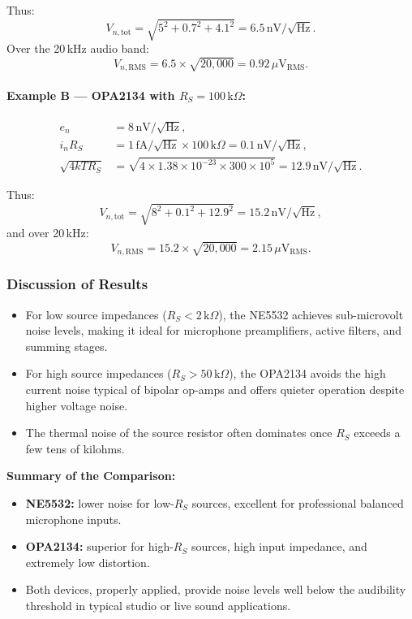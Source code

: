 Thus:
\[
V_{n,\text{tot}} = \sqrt{5^2 + 0.7^2 + 4.1^2} = 6.5\,\mathrm{nV}/\sqrt{\mathrm{Hz}}.
\]
Over the 20\,kHz audio band:
\[
V_{n,\text{RMS}} = 6.5 \times \sqrt{20{,}000} = 0.92\,\mu\text{V}_{\mathrm{RMS}}.
\]

\paragraph{Example B — OPA2134 with $R_S = 100\,\text{k}\Omega$:}
\[
\begin{aligned}
e_n &= 8\,\mathrm{nV}/\sqrt{\mathrm{Hz}}, \\
i_n R_S &= 1\,\mathrm{fA}/\sqrt{\mathrm{Hz}} \times 100\,\text{k}\Omega = 0.1\,\mathrm{nV}/\sqrt{\mathrm{Hz}}, \\
\sqrt{4kTR_S} &= \sqrt{4 \times 1.38\times10^{-23} \times 300 \times 10^5} = 12.9\,\mathrm{nV}/\sqrt{\mathrm{Hz}}.
\end{aligned}
\]

Thus:
\[
V_{n,\text{tot}} = \sqrt{8^2 + 0.1^2 + 12.9^2} = 15.2\,\mathrm{nV}/\sqrt{\mathrm{Hz}},
\]
and over 20\,kHz:
\[
V_{n,\text{RMS}} = 15.2 \times \sqrt{20{,}000} = 2.15\,\mu\text{V}_{\mathrm{RMS}}.
\]

\subsubsection{Discussion of Results}

\begin{itemize}
  \item For low source impedances ($R_S < 2\,\text{k}\Omega$), the NE5532 achieves sub-microvolt noise levels, making it ideal for microphone preamplifiers, active filters, and summing stages.
  \item For high source impedances ($R_S > 50\,\text{k}\Omega$), the OPA2134 avoids the high current noise typical of bipolar op-amps and offers quieter operation despite higher voltage noise.
  \item The thermal noise of the source resistor often dominates once $R_S$ exceeds a few tens of kilohms.
\end{itemize}

\textbf{Summary of the Comparison:}
\begin{itemize}
  \item \textbf{NE5532:} lower noise for low-$R_S$ sources, excellent for professional balanced microphone inputs.
  \item \textbf{OPA2134:} superior for high-$R_S$ sources, high input impedance, and extremely low distortion.
  \item Both devices, properly applied, provide noise levels well below the audibility threshold in typical studio or live sound applications.
\end{itemize}

